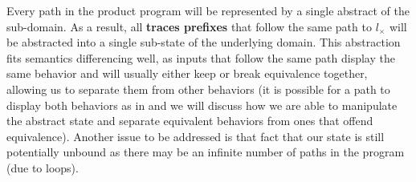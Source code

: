 
Every path in the product program will be represented by a single abstract of the sub-domain. As a result, all \textbf{traces prefixes} that follow the same path to $l_{\times}$ will be abstracted into a single sub-state of the underlying domain. This abstraction fits semantics differencing well, as inputs that follow the same path display the same behavior and will usually either keep or break equivalence together, allowing us to separate them from other behaviors (it is possible for a path to display both behaviors as in  and we will discuss how we are able to manipulate the abstract state and separate equivalent behaviors from ones that offend equivalence). Another issue to be addressed is that fact that our state is still potentially unbound as there may be an infinite number of paths in the program (due to loops).

